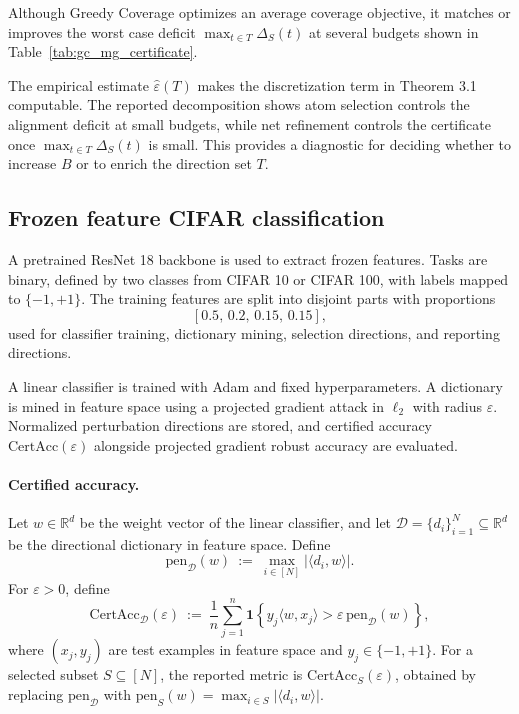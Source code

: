 \documentclass[accepted]{uai2026}
\theoremstyle{plain}
\theoremstyle{definition}
\theoremstyle{remark}
\begin{document}
Although Greedy Coverage optimizes an average coverage objective, it matches or improves the worst case deficit $\max_{t \in T}\Delta_S(t)$ at several budgets shown in Table~\ref{tab:gc_mg_certificate}.

The empirical estimate $\widehat{\varepsilon}(T)$ makes the discretization term in Theorem 3.1 computable. The reported decomposition shows atom selection controls the alignment deficit at small budgets, while net refinement controls the certificate once $\max_{t \in T}\Delta_S(t)$ is small. This provides a diagnostic for deciding whether to increase $B$ or to enrich the direction set $T$.


\subsection{Frozen feature CIFAR classification}
\label{app:frozen-details}

A pretrained ResNet 18 backbone is used to extract frozen features. Tasks are binary, defined by two classes from CIFAR 10 or CIFAR 100, with labels mapped to $\{-1,+1\}$. The training features are split into disjoint parts with proportions
\[
[0.5,\,0.2,\,0.15,\,0.15],
\]
used for classifier training, dictionary mining, selection directions, and reporting directions.

A linear classifier is trained with Adam and fixed hyperparameters. A dictionary is mined in feature space using a projected gradient attack in $\ell_2$ with radius $\varepsilon$. Normalized perturbation directions are stored, and certified accuracy $\mathrm{CertAcc}(\varepsilon)$ alongside projected gradient robust accuracy are evaluated.

\paragraph{Certified accuracy.}
\label{app:certacc}
Let $w\in\mathbb{R}^d$ be the weight vector of the linear classifier, and let
$\mathcal D=\{d_i\}_{i=1}^N \subseteq \mathbb{R}^d$ be the directional dictionary in feature space.
Define
\[
\mathrm{pen}_{\mathcal D}(w)\ :=\ \max_{i\in[N]} \big|\langle d_i, w\rangle\big|.
\]
For $\varepsilon>0$, define
\[
\mathrm{CertAcc}_{\mathcal D}(\varepsilon)\ :=\ \frac{1}{n}\sum_{j=1}^n
\mathbf{1}\!\left\{ y_j\langle w, x_j\rangle > \varepsilon\,\mathrm{pen}_{\mathcal D}(w)\right\},
\]
where $(x_j,y_j)$ are test examples in feature space and $y_j\in\{-1,+1\}$.
For a selected subset $S\subseteq[N]$, the reported metric is $\mathrm{CertAcc}_{S}(\varepsilon)$, obtained by replacing
$\mathrm{pen}_{\mathcal D}$ with $\mathrm{pen}_{S}(w)=\max_{i\in S}|\langle d_i,w\rangle|$.
\end{document}
